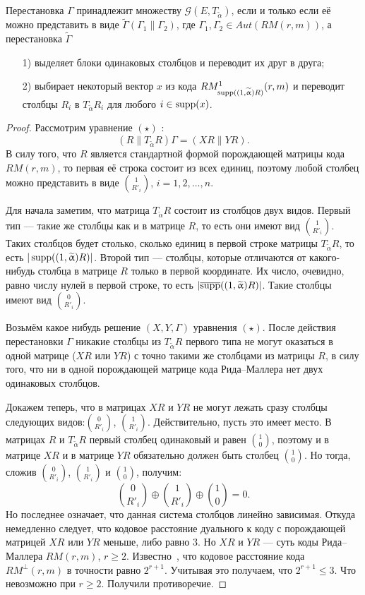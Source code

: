 \begin{proposition}\label{prop20}
Перестановка $\Gamma$ принадлежит множеству $\mathcal
G(E,T_{\widetilde\alpha})$, если и только если её можно представить
в виде $\widetilde\Gamma(\Gamma_1\|\Gamma_2)$, где
$\Gamma_1,\Gamma_2\in Aut(RM(r,m))$, а перестановка
$\widetilde\Gamma$
\begin{itemize}
\item[1)]выделяет блоки одинаковых столбцов и переводит их друг в
друга;
\item[2)] выбирает некоторый вектор $x$ из кода
$RM^1_{\operatorname{supp}((1,\widetilde{\upalpha})R)}(r,m)$ и переводит столбцы
$R_i$ в $T_{\widetilde\alpha}R_i$ для любого $i\in \operatorname{supp}(x)$.
\end{itemize}
\end{proposition}
\begin{proof}
Рассмотрим уравнение $(\star)$ :
$$
(R\|T_{\widetilde\alpha}R)\Gamma=(XR\|YR).
$$
В силу того, что $R$ является стандартной формой порождающей матрицы
кода $RM(r,m)$, то первая её строка состоит из всех единиц,
поэтому любой столбец можно представить в виде $\binom{1}{R'_i}$,
$i=1,2,\ldots,n$.

Для начала заметим, что матрица $T_{\widetilde\alpha}R$ состоит из
столбцов двух видов. Первый тип --- такие же столбцы как и в
матрице $R$, то есть они имеют вид $\binom{1}{R'_i}$. Таких
столбцов будет столько, сколько единиц в первой строке матрицы
$T_{\widetilde\alpha}R$, то есть $|\operatorname{supp}((1,\widetilde{\upalpha})R)|$.
Второй тип
--- столбцы, которые отличаются от какого-нибудь столбца в матрице
$R$ только в первой координате. Их число, очевидно, равно числу
нулей в первой строке, то есть
$|\overline{\operatorname{supp}}((1,\widetilde{\upalpha})R)|$. Такие столбцы имеют
вид $\binom{0}{R'_i}$.

Возьмём какое нибудь решение $(X,Y,\Gamma)$ уравнения $(\star)$.
После действия перестановки $\Gamma$ никакие столбцы из
$T_{\widetilde\alpha}R$ первого типа не могут оказаться в одной
матрице ($XR$ или $YR$) с точно такими же столбцами из матрицы
$R$, в силу того, что ни в одной порождающей матрице кода
Рида--Маллера нет двух одинаковых столбцов.

Докажем теперь, что в матрицах $XR$ и $YR$ не могут лежать сразу
столбцы следующих видов:$\binom{0}{R'_i}$, $\binom{1}{R'_i}$.
Действительно, пусть это имеет место. В матрицах $R$ и
$T_{\widetilde\alpha}R$ первый столбец одинаковый и равен
$\binom{1}{0}$, поэтому и в матрице $XR$ и в матрице $YR$
обязательно должен быть столбец $\binom{1}{0}$. Но тогда, сложив
$\binom{0}{R'_i}$, $\binom{1}{R'_i}$ и $\binom{1}{0}$, получим:
$$
\binom{0}{R'_i}\oplus\binom{1}{R'_i}\oplus\binom{1}{0}=0.
$$
Но последнее означает, что данная система столбцов линейно
зависимая. Откуда немедленно следует, что кодовое расстояние
дуального к коду с порождающей матрицей $XR$ или $YR$ меньше, либо
равно $3$. Но $XR$ и $YR$ --- суть коды Рида--Маллера $RM(r,m)$,
$r\geqslant 2$. Известно~\cite{McWilliams}, что кодовое расстояние
кода $RM^{\perp}(r,m)$ в точности равно $2^{r+1}$. Учитывая это
получаем, что $2^{r+1}\leqslant 3$. Что невозможно при $r\geqslant
2$. Получили противоречие.


\end{proof}
